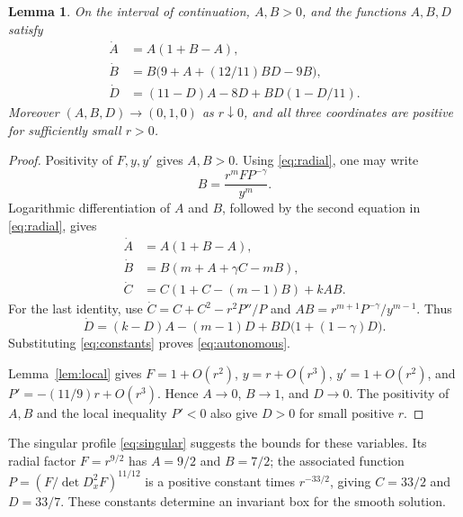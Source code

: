 \documentclass[11pt]{article}
\newtheorem{lemma}[theorem]{Lemma}
\theoremstyle{remark}
\begin{document}
\begin{lemma}\label{lem:autonomous}
On the interval of continuation, $A,B>0$, and the functions
$A,B,D$ satisfy
\begin{equation}\label{eq:autonomous}
 \begin{aligned}
  \dot A&=A(1+B-A),\\
  \dot B&=B\bigl(9+A+(12/11)BD-9B\bigr),\\
  \dot D&=(11-D)A-8D+BD(1-D/11).
 \end{aligned}
\end{equation}
Moreover $(A,B,D)\to(0,1,0)$ as $r\downarrow0$, and all three
coordinates are positive for sufficiently small $r>0$.
\end{lemma}
\begin{proof}
Positivity of $F,y,y'$ gives $A,B>0$.
Using \eqref{eq:radial}, one may write
\[
 B=\frac{r^mFP^{-\gamma}}{y^m}.
\]
Logarithmic differentiation of $A$ and $B$, followed by
the second equation in \eqref{eq:radial}, gives
\begin{align*}
 \dot A&=A(1+B-A),\\
 \dot B&=B(m+A+\gamma C-mB),\\
 \dot C&=C(1+C-(m-1)B)+kAB.
\end{align*}
For the last identity, use
$\dot C=C+C^2-r^2P''/P$ and
$AB=r^{m+1}P^{-\gamma}/y^{m-1}$.
Thus
\[
 \dot D=(k-D)A-(m-1)D+BD\bigl(1+(1-\gamma)D\bigr).
\]
Substituting \eqref{eq:constants} proves \eqref{eq:autonomous}.

Lemma~\ref{lem:local} gives
$F=1+O(r^2)$, $y=r+O(r^3)$, $y'=1+O(r^2)$,
and $P'=-(11/9)r+O(r^3)$.
Hence $A\to0$, $B\to1$, and $D\to0$.
The positivity of $A,B$ and the local inequality $P'<0$
also give $D>0$ for small positive $r$.
\end{proof}

The singular profile \eqref{eq:singular} suggests the bounds for
these variables.  Its radial factor $F=r^{9/2}$ has
$A=9/2$ and $B=7/2$; the associated function
$P=(F/\det D_x^2F)^{11/12}$ is a positive constant times
$r^{-33/2}$, giving $C=33/2$ and $D=33/7$.
These constants determine an invariant box for the smooth solution.
\end{document}
